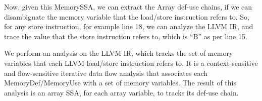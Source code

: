 Now, given this MemorySSA, we can extract the 
Array def-use chains, if we can disambiguate the memory variable
that the load/store instruction refers to. 
So, for any store instruction, for example line 18, we can analyze the 
LLVM IR, and trace the value that the store instruction refers to, 
which is ``B'' as per line 15. 

We perform an analysis 
on the LLVM IR, which tracks the set of memory variables that each 
LLVM load/store instruction refers to. 
It is a context-sensitive and flow-sensitive 
iterative data flow analysis that associates each MemoryDef/MemoryUse with a set of memory variables. The result of this analysis is an
array SSA, for each array variable, to tracks its def-use chain.
\vspace{-20pt}
